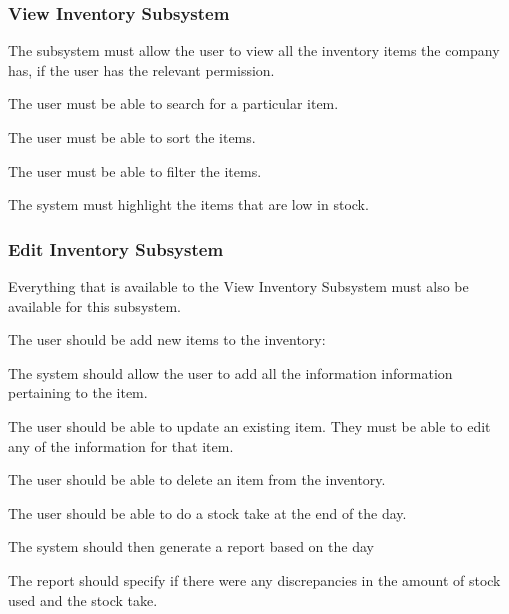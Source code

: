 \documentclass{article}
\begin{document}
	\subsubsection*{View Inventory Subsystem}	
	\begin{list}{R.}{}
		\item The subsystem must allow the user to view all the inventory items the company has, if the user has the relevant permission.
		\begin{list}{R.}{}
			\item The user must be able to search for a particular item.
			\item The user must be able to sort the items.
			\item The user must be able to filter the items.
		\end{list}
		\item The system must highlight the items that are low in stock.
	\end{list}
	\subsubsection*{Edit Inventory Subsystem}	
	\begin{list}{R}{}
		\item Everything that is available to the View Inventory Subsystem must also be available for this subsystem.
		\item The user should be add new items to the inventory:
		\begin{list}{R.}{}
			\item The system should allow the user to add all the information information pertaining to the item.
		\end{list}
		\item The user should be able to update an existing item. They must be able to edit any of the information for that item.
		\item The user should be able to delete an item from the inventory.
	    \item The user should be able to do a stock take at the end of the day.
	    \begin{list}{R.}{}
	    	\item The system should then generate a report based on the day 
	    	\item The report should specify if there were any discrepancies in the amount of stock used and the stock take.
	    \end{list}
	\end{list}
	
\end{document}
